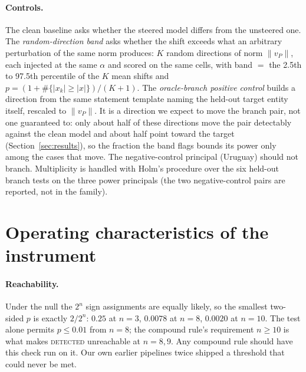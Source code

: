 \documentclass{article}
\begin{document}
\paragraph{Controls.}
The clean baseline asks whether the steered model differs from the unsteered one. The
\emph{random-direction band} asks whether the shift exceeds what an arbitrary perturbation of the
same norm produces: $K$ random directions of norm $\lVert v_P\rVert$, each injected at the same
$\alpha$ and scored on the same cells, with band $=$ the 2.5th to 97.5th percentile of the $K$ mean
shifts and $p=(1+\#\{|x_k|\ge|x|\})/(K+1)$. The \emph{oracle-branch positive control} builds
a direction from the same statement template naming the held-out target entity itself, rescaled to
$\lVert v_P\rVert$. It is a direction we expect to move the branch pair, not one guaranteed to: only about half of these
directions move the pair detectably against the clean model and about half point toward the target (Section~\ref{sec:results}), so
the fraction the band flags bounds its power only among the cases that move. The negative-control principal (Uruguay) should not branch.
Multiplicity is handled with Holm's procedure over the six held-out branch tests on the three power
principals (the two negative-control pairs are reported, not in the family).

\section{Operating characteristics of the instrument}
\label{sec:oc}

\paragraph{Reachability.}
Under the null the $2^n$ sign assignments are equally likely, so the smallest two-sided $p$ is
exactly $2/2^n$: $0.25$ at $n{=}3$, $0.0078$ at $n{=}8$, $0.0020$ at $n{=}10$. The test alone
permits $p\le0.01$ from $n{=}8$; the compound rule's requirement $n\ge10$ is what makes
\textsc{detected} unreachable at $n{=}8,9$. Any compound rule should have this check run on it. Our
own earlier pipelines twice shipped a threshold that could never be met.
\end{document}
